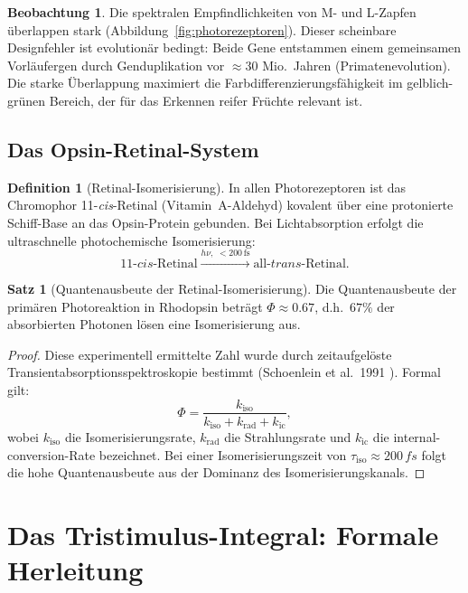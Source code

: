 ﻿\documentclass[a4paper,12pt]{article}
\theoremstyle{definition}
\newtheorem{definition}{Definition}
\newtheorem{satz}{Satz}
\newtheorem{beobachtung}{Beobachtung}
\begin{document}
\begin{beobachtung}
Die spektralen Empfindlichkeiten von M- und L-Zapfen überlappen stark
(Abbildung~\ref{fig:photorezeptoren}). Dieser scheinbare Designfehler ist
evolutionär bedingt: Beide Gene entstammen einem gemeinsamen Vorläufergen
durch Genduplikation vor $\approx 30$ Mio.\ Jahren (Primatenevolution).
Die starke Überlappung maximiert die Farbdifferenzierungsfähigkeit im
gelblich-grünen Bereich, der für das Erkennen reifer Früchte relevant ist.
\end{beobachtung}

\subsection{Das Opsin-Retinal-System}

\begin{definition}[Retinal-Isomerisierung]
In allen Photorezeptoren ist das Chromophor 11-\textit{cis}-Retinal (Vitamin~A-Aldehyd)
kovalent über eine protonierte Schiff-Base an das Opsin-Protein gebunden.
Bei Lichtabsorption erfolgt die ultraschnelle photochemische Isomerisierung:
\[
  11\text{-}\textit{cis}\text{-Retinal} \xrightarrow{h\nu,\; < 200\,\mathrm{fs}} \text{all-}\textit{trans}\text{-Retinal}.
\]
\end{definition}

\begin{satz}[Quantenausbeute der Retinal-Isomerisierung]
Die Quantenausbeute der primären Photoreaktion in Rhodopsin beträgt
$\Phi \approx 0.67$, d.h.\ $67\%$ der absorbierten Photonen lösen eine Isomerisierung aus.
\end{satz}

\begin{proof}
Diese experimentell ermittelte Zahl wurde durch zeitaufgelöste Transientabsorptionsspektroskopie
bestimmt (Schoenlein et al.\ 1991 \cite{schoenlein1991}). Formal gilt:
\[
  \Phi = \frac{k_\mathrm{iso}}{k_\mathrm{iso} + k_\mathrm{rad} + k_\mathrm{ic}},
\]
wobei $k_\mathrm{iso}$ die Isomerisierungsrate, $k_\mathrm{rad}$ die Strahlungsrate und
$k_\mathrm{ic}$ die internal-conversion-Rate bezeichnet.
Bei einer Isomerisierungszeit von $\tau_\mathrm{iso} \approx 200\,\si{fs}$ folgt
die hohe Quantenausbeute aus der Dominanz des Isomerisierungskanals.
\end{proof}

\section{Das Tristimulus-Integral: Formale Herleitung}
\end{document}

